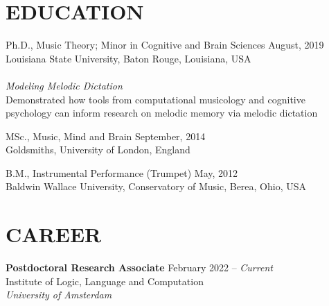 \documentclass[11pt]{res} %
\begin{document}
\begin{resume}

\section{EDUCATION} 
\vspace{8pt} %
Ph.D., Music Theory; Minor in Cognitive and Brain Sciences  \hfill August, 2019  \\
Louisiana State University, Baton Rouge, Louisiana, USA \\ \\
\-\hspace{1cm} \emph{Modeling Melodic Dictation} \\
\-\hspace{1cm} Demonstrated how tools from computational musicology and cognitive \\ \-\hspace{1cm} psychology can inform research on melodic memory via melodic dictation

MSc., Music, Mind and Brain \hfill September, 2014\\
Goldsmiths, University of London, England

B.M., Instrumental Performance (Trumpet) \hfill May, 2012 \\ 
Baldwin Wallace University, Conservatory of Music, Berea, Ohio, USA 

\section{CAREER}
\vspace{8pt} %

\textbf{Postdoctoral Research Associate} \hfill February 2022 -- \textit{Current}
\\Institute of Logic, Language and Computation\\ \textit{University of Amsterdam}


\end{resume}
\end{document}
